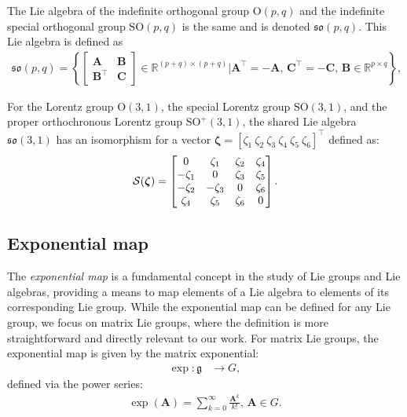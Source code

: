 \begin{example}\label{ex:lorentz-group-lie-algebra}
    The Lie algebra of the indefinite orthogonal group $\text{O}(p, q)$ and the indefinite special orthogonal group $\text{SO}(p, q)$ is the same and is denoted $\mathfrak{so}(p, q)$. This Lie algebra is defined as
    \begin{align*}
        \mathfrak{so}(p, q) = \left\{
            \begin{bmatrix}
                \mathbf{A} & \mathbf{B}\\
                \mathbf{B}^\top & \mathbf{C}
            \end{bmatrix} \in \mathbb{R}^{(p+q)\times(p+q)} | \mathbf{A}^\top = -\mathbf{A},\, \mathbf{C}^\top = -\mathbf{C},\, \mathbf{B} \in \mathbb{R}^{p\times q}
        \right\},
    \end{align*}

    For the Lorentz group $\text{O}(3, 1)$, the special Lorentz group $\text{SO}(3, 1)$, and the proper orthochronous Lorentz group $\text{SO}^+(3, 1)$, the shared Lie algebra $\mathfrak{so}(3, 1)$ has an isomorphism for a vector $\boldsymbol{\zeta} = [\zeta_1\ \zeta_2\ \zeta_3\ \zeta_4\ \zeta_5\ \zeta_6]^\top$ defined as:
    \begin{align*}
        \SL[\boldsymbol{\zeta}] = \begin{bmatrix}
            0 & \zeta_1 & \zeta_2 & \zeta_4 \\
            -\zeta_1 & 0 & \zeta_3 & \zeta_5 \\
            -\zeta_2 & -\zeta_3 & 0 & \zeta_6 \\
            \zeta_4 & \zeta_5 & \zeta_6 & 0
        \end{bmatrix}.
    \end{align*}
\end{example}
\subsection{Exponential map}\label{sec:background-exponential-map}
The \emph{exponential map} is a fundamental concept in the study of Lie groups and Lie algebras, providing a means to map elements of a Lie algebra to elements of its corresponding Lie group. While the exponential map can be defined for any Lie group, we focus on matrix Lie groups, where the definition is more straightforward and directly relevant to our work. For matrix Lie groups, the exponential map is given by the matrix exponential:
\begin{align}
    \exp : \mathfrak{g} &\to G,
\end{align}
defined via the power series:
\begin{align}
    \exp(\mathbf{A}) = \sum_{k=0}^\infty \frac{\mathbf{A}^k}{k!},\,\mathbf{A}\in G.
\end{align}

